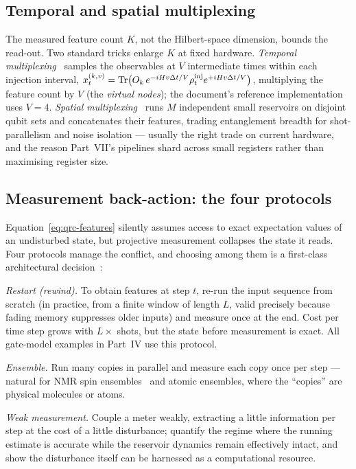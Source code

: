 \subsection{Temporal and spatial multiplexing}

The measured feature count $K$, not the Hilbert-space dimension, bounds the
read-out. Two standard tricks enlarge $K$ at fixed hardware.
\emph{Temporal multiplexing}~\citep{fujii2017harnessing} samples the
observables at $V$ intermediate times within each injection interval,
$x_t^{(k,v)} = \operatorname{Tr}\bigl(O_k\, e^{-iH v\Delta t/V}\rho_t^{\mathrm{inj}}
e^{+iH v\Delta t/V}\bigr)$, multiplying the feature count by $V$ (the
\emph{virtual nodes}); the document's reference implementation uses $V=4$.
\emph{Spatial multiplexing}~\citep{nakajima2019boosting} runs $M$ independent
small reservoirs on disjoint qubit sets and concatenates their features,
trading entanglement breadth for shot-parallelism and noise isolation ---
usually the right trade on current hardware, and the reason Part~VII's
pipelines shard across small registers rather than maximising register size.

\subsection{Measurement back-action: the four protocols}
\label{sec:backaction}

Equation~\eqref{eq:qrc-features} silently assumes access to exact expectation
values of an undisturbed state, but projective measurement collapses the state
it reads. Four protocols manage the conflict, and choosing among them is a
first-class architectural decision~\citep{mujal2023time}:

\emph{Restart (rewind).} To obtain features at step $t$, re-run the input
sequence from scratch (in practice, from a finite window of length $L$, valid
precisely because fading memory suppresses older inputs) and measure once at
the end. Cost per time step grows with $L\times$ shots, but the state before
measurement is exact. All gate-model examples in Part~IV use this protocol.

\emph{Ensemble.} Run many copies in parallel and measure each copy once per
step --- natural for NMR spin ensembles~\citep{negoro2018machine} and atomic
ensembles, where the ``copies'' are physical molecules or atoms.

\emph{Weak measurement.} Couple a meter weakly, extracting a little
information per step at the cost of a little disturbance;
\citet{mujal2023time} quantify the regime where the running estimate is
accurate while the reservoir dynamics remain effectively intact, and
\citet{franceschetto2024harnessing} show the disturbance itself can be
harnessed as a computational resource.

